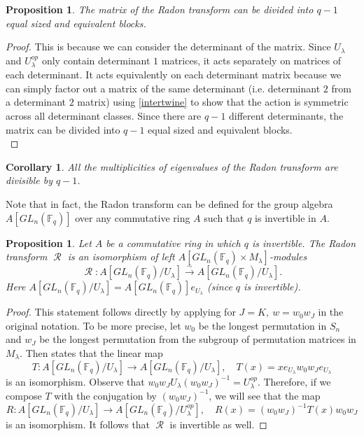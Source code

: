 \documentclass[12pt,reqno]{amsart}
\newtheorem{cor}[thm]{Corollary}
\newtheorem{prop}[thm]{Proposition}
\theoremstyle{definition}
\theoremstyle{remark}
\numberwithin{equation}{section}
\newcommand{\GL}[1]{GL_{#1}(\mathbb{F}_q)}
\DeclareMathOperator{\R}{\mathcal{R}}
\begin{document}
\begin{prop}\label{blocks}
    The matrix of the Radon transform can be divided into $q-1$ equal sized and equivalent blocks.\\
\end{prop}
\begin{proof}
    This is because we can consider the determinant of the matrix. Since $U_\lambda$ and $U_\lambda^{op}$ only contain determinant $1$ matrices, it acts separately on matrices of each determinant. It acts equivalently on each determinant matrix because we can simply factor out a matrix of the same determinant (i.e. determinant $2$ from a determinant $2$ matrix) using \ref{intertwine} to show that the action is symmetric across all determinant classes. Since there are $q-1$ different determinants, the matrix can be divided into $q-1$ equal sized and equivalent blocks.\\
\end{proof}

\begin{cor}
    All the multiplicities of eigenvalues of the Radon transform are divisible by $q-1$.\\
\end{cor}

Note that in fact, the Radon transform can be defined for the group algebra $A[\GL{n}]$ over any commutative ring $A$ such that $q$ is invertible in $A$.\\

\begin{prop}
    Let $A$ be a commutative ring in which $q$ is invertible. The Radon transform $\R$ is an isomorphism of left $A[\GL{n}\times M_{\lambda}]$-modules
    \[
    \R: A[\GL{n}/U_{\lambda}]\xrightarrow{\sim} A[\GL{n}/U_{\lambda}].
    \]
    Here $A[\GL{n}/U_{\lambda}]=A[\GL{n}]e_{U_{\lambda}}$ (since $q$ is invertible).
\end{prop}

\begin{proof}
    This statement follows directly by applying \cite[Theorem 2.4]{HL} for $J=K,\ w=w_0w_J$ in the original notation. To be more precise, let $w_0$ be the longest permutation in $S_n$ and $w_J$ be the longest permutation from the subgroup of permutation matrices in $M_{\lambda}$. Then \cite[Theorem 2.4]{HL} states that the linear map
    \[
    T: A[\GL{n}/U_{\lambda}] \rightarrow A[\GL{n}/U_{\lambda}], \quad T(x)=xe_{U_\lambda}w_0w_Je_{U_\lambda}
    \]
    is an isomorphism. Observe that $w_0w_J U_{\lambda}(w_0w_J)^{-1}=U_{\lambda}^{op}$. Therefore, if we compose $T$ with the conjugation by $(w_0w_J)^{-1}$, we will see that the map
    \[
    R: A[\GL{n}/U_{\lambda}] \rightarrow A[\GL{n}/U_{\lambda}^{op}], \quad R(x)=(w_0w_J)^{-1} T(x)w_0w_J
    \]
    is an isomorphism. It follows that $\R$ is invertible as well.
\end{proof}
\end{document}
